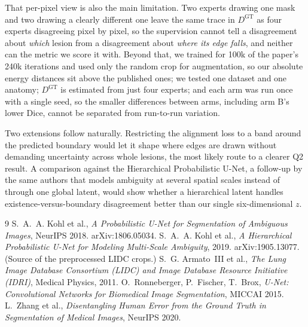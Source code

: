 \documentclass[10pt]{article}
\newcommand{\Dgt}{D^{\mathrm{GT}}}
\begin{document}
That per-pixel view is also the main limitation. Two experts drawing one mask and
two drawing a clearly different one leave the same trace in $\Dgt$ as four experts
disagreeing pixel by pixel, so the supervision cannot tell a disagreement about
\emph{which} lesion from a disagreement about \emph{where its edge falls}, and
neither can the metric we score it with. Beyond that, we trained for
100k of the paper's 240k iterations and used only the random crop for
augmentation, so our absolute energy distances sit above the published ones; we
tested one dataset and one anatomy; $\Dgt$ is estimated from just four experts;
and each arm was run once with a single seed, so the smaller differences between
arms, including arm B's lower Dice, cannot be separated from run-to-run
variation.

Two extensions follow naturally. Restricting the alignment loss to a band around
the predicted boundary would let it shape where edges are drawn without demanding
uncertainty across whole lesions, the most likely route to a clearer Q2 result. A
comparison against the
Hierarchical Probabilistic U-Net, a follow-up by the same authors that models
ambiguity at several spatial scales instead of through one global latent, would
show whether a hierarchical latent handles existence-versus-boundary
disagreement better than our single six-dimensional $z$.

{\footnotesize
\begin{thebibliography}{9}\setlength{\itemsep}{0pt}
 S.~A.~A. Kohl et al., \emph{A Probabilistic U-Net for
Segmentation of Ambiguous Images}, NeurIPS 2018. arXiv:1806.05034.
 S.~A.~A. Kohl et al., \emph{A Hierarchical Probabilistic U-Net
for Modeling Multi-Scale Ambiguity}, 2019. arXiv:1905.13077. (Source of the
preprocessed LIDC crops.)
 S.~G. Armato~III et al., \emph{The Lung Image Database Consortium
(LIDC) and Image Database Resource Initiative (IDRI)}, Medical Physics, 2011.
 O.~Ronneberger, P.~Fischer, T.~Brox, \emph{U-Net:
Convolutional Networks for Biomedical Image Segmentation}, MICCAI 2015.
 L.~Zhang et al., \emph{Disentangling Human Error from the
Ground Truth in Segmentation of Medical Images}, NeurIPS 2020.

\end{thebibliography}}
\end{document}
